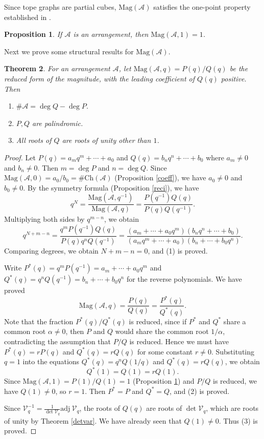 \documentclass{amsart}
\numberwithin{equation}{section}
\newtheorem{thm}{Theorem}[section]
\newtheorem{prop}[thm]{Proposition}
\theoremstyle{plain}
\theoremstyle{remark}
\theoremstyle{definition}
\numberwithin{equation}{section}
\newcommand{\A}{\mathcal{A}}
\newcommand{\Mag}{\mathrm{Mag}}
\newcommand{\Ch}{\mathrm{Ch}}
\begin{document}
Since tope graphs are partial cubes, $\Mag(\A)$ satisfies the one-point property established in \cite{Leinster2023}.
\begin{prop}\label{1pt}
    If $\A$ is an arrangement, then $\Mag(\A,1)=1$.
\end{prop}

Next we prove some structural results for $\Mag(\A)$.
\begin{thm}
For an arrangement $\A$, let $\Mag(\A,q)=P(q)/Q(q)$ be the reduced form of the magnitude, with the leading coefficient of $Q(q)$ positive. Then
\begin{enumerate}
    \item $\#\A=\deg Q-\deg P$.
    \item $P,Q$ are palindromic.
    \item All roots of $Q$ are roots of unity other than $1$.
\end{enumerate}
\end{thm}
\begin{proof}
Let $P(q)=a_mq^m+\cdots+a_0$ and $Q(q)=b_nq^n+\cdots+b_0$ where $a_m\neq 0$ and $b_n\neq 0$. Then $m=\deg P$ and $n=\deg Q$. Since $\Mag(\A,0)=a_0/b_0=\#\Ch(\A)$ (Proposition \ref{coeff}), we have $a_0\neq 0$ and $b_0\neq 0$. By the symmetry formula (Proposition \ref{reci}), we have
\[
q^N=\frac{\Mag(\A,q^{-1})}{\Mag(\A,q)}=\frac{P(q^{-1})Q(q)}{P(q)Q(q^{-1})}.
\]
Multiplying both sides by $q^{m-n}$, we obtain
\[
q^{N+m-n}=\frac{q^mP(q^{-1})Q(q)}{P(q)q^nQ(q^{-1})}=\frac{(a_m+\cdots+a_0q^m)(b_nq^n+\cdots+b_0)}{(a_mq^m+\cdots+a_0)(b_n+\cdots+b_0q^n)}.
\]
Comparing degrees, we obtain $N+m-n=0$, and (1) is proved.

Write $P^*(q)=q^mP(q^{-1})=a_m+\cdots+a_0q^m$ and $Q^*(q)=q^nQ(q^{-1})=b_n+\cdots+b_0q^n$ for the reverse polynomials. We have proved
\[
\Mag(\A,q)=\frac{P(q)}{Q(q)}=\frac{P^*(q)}{Q^*(q)}.
\]
Note that the fraction $P^*(q)/Q^*(q)$ is reduced, since if $P^*$ and $Q^*$ share a common root $\alpha\neq0$, then $P$ and $Q$ would share the common root $1/\alpha$, contradicting the assumption that $P/Q$ is reduced. Hence we must have $P^*(q)=rP(q)$ and $Q^*(q)=rQ(q)$ for some constant $r\neq0$. Substituting $q=1$ into the equations $Q^*(q)=q^nQ(1/q)$ and $Q^*(q)=rQ(q)$, we obtain
\[
Q^*(1)=Q(1)=rQ(1).
\]
Since $\Mag(\A,1)=P(1)/Q(1)=1$ (Proposition \ref{1pt}) and $P/Q$ is reduced, we have $Q(1)\neq 0$, so $r=1$. Then $P^*=P$ and $Q^*=Q$, and (2) is proved.

Since $\mathcal{V}_q^{-1}=\frac{1}{\det\mathcal{V}_q}\mathrm{adj~}\mathcal{V}_q$, the roots of $Q(q)$ are roots of $\det\mathcal{V}_q$, which are roots of unity by Theorem \ref{detvar}. We have already seen that $Q(1)\neq 0$. Thus (3) is proved.
\end{proof}
\end{document}
